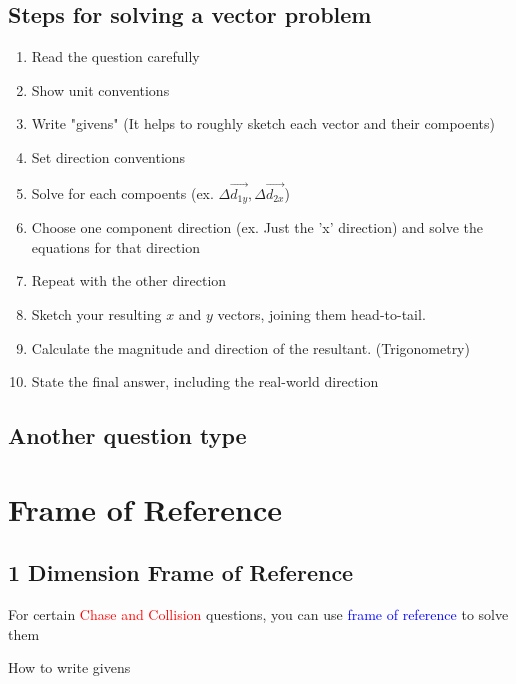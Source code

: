 \subsection{Steps for solving a vector problem}
\begin{enumerate}
    \item Read the question carefully
    \item Show unit conventions
    \item Write "givens" (It helps to roughly sketch each vector and their compoents)
    \item Set direction conventions
    \item Solve for each compoents (ex. $\Delta\vec{d_{1y}}, \Delta\vec{d_{2x}}$)
    \item Choose one component direction (ex. Just the 'x' direction) and solve the equations for that direction
    \item Repeat with the other direction
    \item Sketch your resulting $x$ and $y$ vectors, joining them head-to-tail. 
    \item Calculate the magnitude and direction of the resultant. (Trigonometry)
    \item State the final answer, including the real-world direction
\end{enumerate}


\subsection{Another question type}

\newpage
\section{Frame of Reference}
\subsection{1 Dimension Frame of Reference}
For certain \textcolor{red}{Chase and Collision} questions, you can use \textcolor{blue}{frame of reference} 
to solve them
\begin{example}
    How to write givens\\
\end{example}
\newpage
